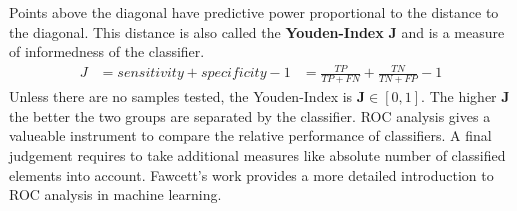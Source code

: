 Points above the diagonal have predictive power proportional to the distance to the diagonal.
This distance is also called the \textbf{Youden-Index} $\mathbf{J}$\cite{youden_cancer1950} and is a measure of informedness of the classifier.
\begin{equation}
\begin{aligned}
    J &= sensitivity + specificity - 1
      &= \frac{TP}{TP + FN} + \frac{TN}{TN + FP} - 1
\end{aligned}
\label{eq:youden}
\end{equation}
Unless there are no samples tested, the Youden-Index is $\mathbf{J} \in [0, 1]$.
The higher $\mathbf{J}$ the better the two groups are separated by the classifier.
ROC analysis gives a valueable instrument to compare the relative performance of classifiers.
A final judgement requires to take additional measures like absolute number of classified elements into account.
Fawcett's\cite{fawcett_2006} work provides a more detailed introduction to ROC analysis in machine learning.
